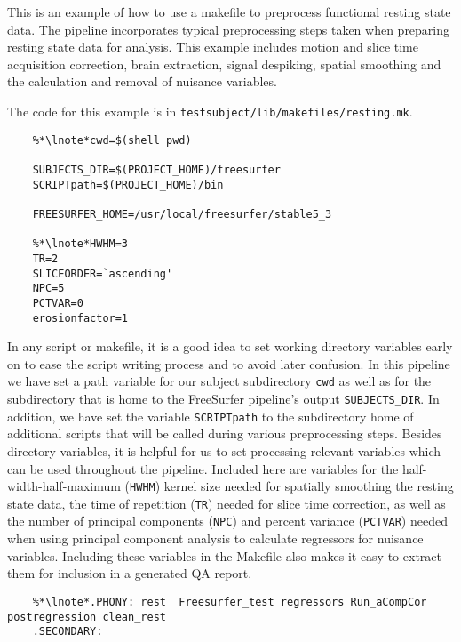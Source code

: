 \label{example:restingstate}
This is an example of how to use a makefile to preprocess functional resting state data. The pipeline incorporates typical preprocessing steps taken when preparing resting state data for analysis. This example includes motion and slice time acquisition correction, brain extraction, signal despiking, spatial smoothing and the calculation and removal of nuisance variables.

The code for this example is in \texttt{testsubject/lib/makefiles/resting.mk}. 

\setcounter{codehighlight}{0} %
\begin{lstlisting}
	%*\lnote*cwd=$(shell pwd)

	SUBJECTS_DIR=$(PROJECT_HOME)/freesurfer
	SCRIPTpath=$(PROJECT_HOME)/bin

	FREESURFER_HOME=/usr/local/freesurfer/stable5_3

	%*\lnote*HWHM=3
	TR=2
	SLICEORDER=`ascending'
	NPC=5
	PCTVAR=0
	erosionfactor=1
\end{lstlisting}

 In any script or makefile, it is a good idea to set working
directory variables early on to ease the script writing process and to
avoid later confusion.  In this pipeline we have set a path variable
for our subject subdirectory \texttt{cwd} as well as for the
subdirectory that is home to the FreeSurfer pipeline's output
\texttt{SUBJECTS\_DIR}. In addition, we have set the variable
\texttt{SCRIPTpath} to the subdirectory home of additional scripts
that will be called during various preprocessing steps. 
Besides directory variables, it is helpful for us to set
processing-relevant variables which can be used throughout the
pipeline. Included here are variables for the half-width-half-maximum
(\texttt{HWHM}) kernel size needed for spatially smoothing the resting
state data, the time of repetition (\texttt{TR}) needed for slice time
correction, as well as the number of principal components
(\texttt{NPC}) and percent variance (\texttt{PCTVAR}) needed when
using principal component analysis to calculate regressors for
nuisance variables. Including these variables in the Makefile also
makes it easy to extract them for inclusion in a generated QA report.

\begin{lstlisting}
	%*\lnote*.PHONY: rest  Freesurfer_test regressors Run_aCompCor postregression clean_rest
	.SECONDARY:
\end{lstlisting}

